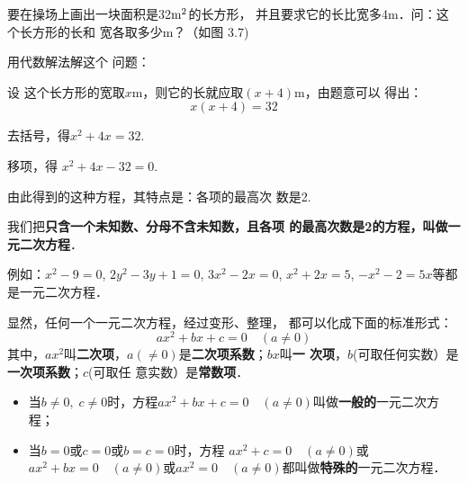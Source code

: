 要在操场上画出一块面积是32${\rm m}^2$的长方形，
并且要求它的长比宽多4m．问：这个长方形的长和
宽各取多少m？（如图
3.7)
\begin{figure}[htp]
    \centering
    \caption{}
\end{figure}


用代数解法解这个
问题：

设 这个长方形的宽取$x$m，则它的长就应取$(x+4)$m，由题意可以
得出：
\[x(x+4)=32\]

去括号，得$x^2+4x=32$.

移项，得 $x^2+4x-32=0$.

由此得到的这种方程，其特点是：各项的最高次
数是2.

我们把\textbf{只含一个未知数、分母不含未知数，且各项
的最高次数是2的方程，叫做一元二次方程}．

例如：$x^2-9=0$, $2y^2-3y+1=0$, $3x^2-2x=0$,
$x^2+2x=5$, $-x^2-2=5x$等都是一元二次方程．

显然，任何一个一元二次方程，经过变形、整理，
都可以化成下面的标准形式：
\[ax^2+bx+c=0\quad (a\ne 0)\]
其中，$ax^2$叫\textbf{二次项}，$a(\ne 0)$是\textbf{二次项系数}；$bx$叫\textbf{一
次项}，$b$(可取任何实数）是\textbf{一次项系数}；$c$(可取任
意实数）是\textbf{常数项}．
\begin{itemize}
    \item 当$b\ne 0,\; c\ne 0$时，方程$ax^2+bx+c=0\quad (a\ne 0)$叫做\textbf{一般的}一元二次方程；
    \item 当$b=0$或$c=0$或$b=c=0$时，方程
$ax^2+c=0\quad (a\ne 0)$或$ax^2+bx=0\quad (a\ne 0)$或$ax^2=0\quad (a\ne 
0)$都叫做\textbf{特殊的}一元二次方程．
\end{itemize}

